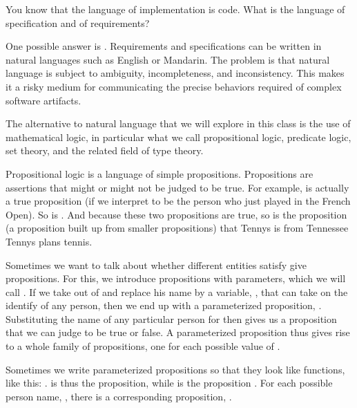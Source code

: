 \documentclass[letterpaper,10pt,english]{sphinxmanual}
\begin{document}
You know that the language of implementation is code. What is the
language of specification and of requirements?

One possible answer is . Requirements and
specifications can be written in natural languages such as English or
Mandarin. The problem is that natural language is subject to
ambiguity, incompleteness, and inconsistency. This makes it a risky
medium for communicating the precise behaviors required of complex
software artifacts.

The alternative to natural language that we will explore in this class
is the use of mathematical logic, in particular what we call propositional
logic, predicate logic, set theory, and the related field of type theory.

Propositional logic is a language of simple propositions. Propositions
are assertions that might or might not be judged to be true. For
example,  is actually a true
proposition (if we interpret  to be the person who just played
in the French Open).  So is . And because
these two propositions are true, so is the  proposition (a
proposition built up from smaller propositions) that Tennys is from
Tennessee  Tennys plans tennis.

Sometimes we want to talk about whether different entities satisfy
give propositions. For this, we introduce propositions with parameters,
which we will call . If we take  out of  and replace his name by a variable, , that can take
on the identify of any person, then we end up with a parameterized
proposition, . Substituting the name of any particular
person for  then gives us a proposition  that we
can judge to be true or false. A parameterized proposition thus gives
rise to a whole family of propositions, one for each possible value of
.

Sometimes we write parameterized propositions so that they look like
functions, like this: .  is thus
the proposition,  while  is
the proposition . For each possible person name,
, there is a corresponding proposition, .
\end{document}

